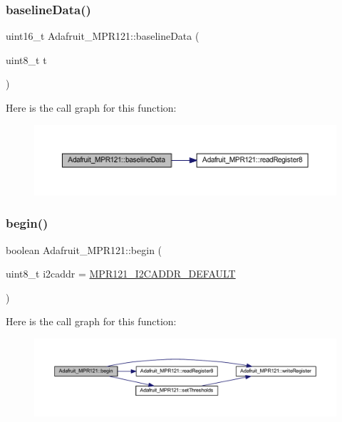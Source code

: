 \subsubsection{\texorpdfstring{baseline\+Data()}{baselineData()}}
{\footnotesize\ttfamily uint16\+\_\+t Adafruit\+\_\+\+M\+P\+R121\+::baseline\+Data (\begin{DoxyParamCaption}\item[{uint8\+\_\+t}]{t }\end{DoxyParamCaption})}

Here is the call graph for this function\+:
\nopagebreak
\begin{figure}[H]
\begin{center}
\leavevmode
\includegraphics[width=350pt]{d9/d2e/class_adafruit___m_p_r121_a663d5e60aeb04b06697b2c40a33b40f0_cgraph}
\end{center}
\end{figure}
\mbox{\label{class_adafruit___m_p_r121_ae269064c42ced60c7450eab53ada5eee}} 
\subsubsection{\texorpdfstring{begin()}{begin()}}
{\footnotesize\ttfamily boolean Adafruit\+\_\+\+M\+P\+R121\+::begin (\begin{DoxyParamCaption}\item[{uint8\+\_\+t}]{i2caddr = {\ttfamily \hyperlink{_adafruit___m_p_r121_8h_aa4a9474e42d9c498f600c9ad8781f714}{M\+P\+R121\+\_\+\+I2\+C\+A\+D\+D\+R\+\_\+\+D\+E\+F\+A\+U\+LT}} }\end{DoxyParamCaption})}

Here is the call graph for this function\+:
\nopagebreak
\begin{figure}[H]
\begin{center}
\leavevmode
\includegraphics[width=350pt]{d9/d2e/class_adafruit___m_p_r121_ae269064c42ced60c7450eab53ada5eee_cgraph}
\end{center}
\end{figure}
\mbox{\label{class_adafruit___m_p_r121_aa5bda4ff04ee361d857b80d95bddbbdb}} 

